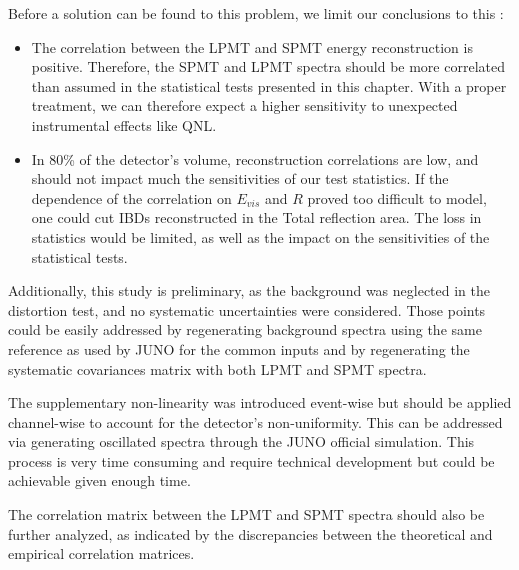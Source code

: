 \documentclass[../main.tex]{subfiles}
\begin{document}
Before a solution can be found to this problem, we limit our conclusions to this :

\begin{itemize}
  \item The correlation between the LPMT and SPMT energy reconstruction is positive. Therefore, the SPMT and LPMT spectra should be more correlated than assumed in the statistical tests presented in this chapter. With a proper treatment, we can therefore expect a higher sensitivity to unexpected instrumental effects like QNL.

  \item In 80\% of the detector's volume, reconstruction correlations are low, and should not impact much the sensitivities of our test statistics. If the dependence of the correlation on $E_{vis}$ and $R$ proved too difficult to model, one could cut IBDs reconstructed in the Total reflection area. The loss in statistics would be limited, as well as the impact on the sensitivities of the statistical tests.
\end{itemize}

Additionally, this study is preliminary, as the background was neglected in the distortion test, and no systematic uncertainties were considered. Those points could be easily addressed by regenerating background spectra using the same reference as used by JUNO for the common inputs and by regenerating the systematic covariances matrix with both LPMT and SPMT spectra.

The supplementary non-linearity was introduced event-wise but should be applied channel-wise to account for the detector's non-uniformity. This can be addressed via generating oscillated spectra through the JUNO official simulation. This process is very time consuming and require technical development but could be achievable given enough time.

The correlation matrix between the LPMT and SPMT spectra should also be further analyzed, as indicated by the discrepancies between the theoretical and empirical correlation matrices.
\end{document}
